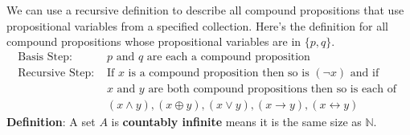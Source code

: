 \documentclass[12pt, oneside]{article}
\begin{document}
We can use a recursive definition to describe all 
compound propositions that use propositional variables 
from a specified collection.  Here's the definition
for all compound propositions whose propositional variables 
are in $\{p, q\}$.
\[
\begin{array}{ll}
\textrm{Basis Step: } & p \textrm{ and } q \textrm{ are each a compound proposition} \\
\textrm{Recursive Step: } & \textrm{If } x \textrm{ is a compound proposition then so is } (\lnot x) 
\textrm{ and if } \\
& x \textrm{ and } y \textrm{ are both compound propositions then so is each of }\\
&(x \land y), (x \oplus y), (x \lor y), (x \to y), (x \leftrightarrow y)
\end{array}
\]
{\bf Definition}: A set $A$ is {\bf countably infinite} means it is the 
same size as $\mathbb{N}$.
\end{document}
